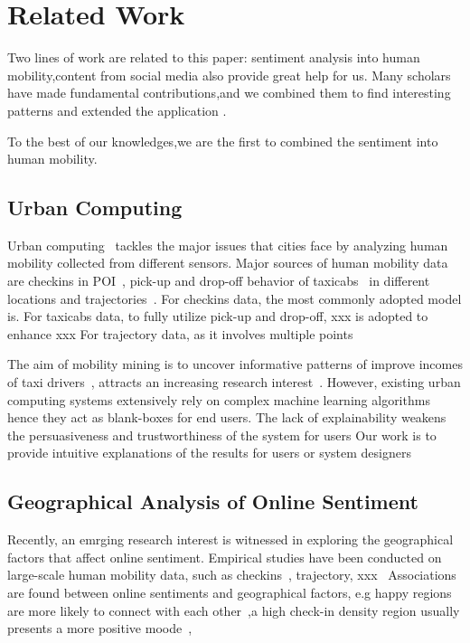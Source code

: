 \documentclass{llncs}
\begin{document}
\section{Related Work}

Two lines of work are related to this paper: sentiment analysis into human mobility,content from social media also provide great help for us. Many scholars have made fundamental contributions,and we combined them to find interesting patterns and extended the application .

To the best of our knowledges,we are the first to combined the sentiment into human mobility.

\subsection{Urban Computing}
%
Urban computing~\cite{1} tackles the major issues that cities face by analyzing human mobility collected from different sensors.  
Major sources of human mobility data are checkins in POI~\cite{}, pick-up and drop-off behavior of taxicabs~\cite{} in different locations and  trajectories~\cite{}.
For checkins data, the most commonly adopted model is.
For taxicabs data, to fully utilize pick-up and drop-off, xxx is adopted to enhance xxx
For trajectory data, as it involves multiple points 

The aim of mobility mining is to uncover informative patterns of improve incomes of taxi drivers~\cite{}, attracts an increasing research interest~\cite{}. 
However, existing urban computing systems extensively rely on complex machine learning algorithms hence they act as blank-boxes for end users. 
The lack of explainability weakens the persuasiveness and trustworthiness of the system for users
Our work is to provide intuitive explanations of the results for users or system designers



\subsection{Geographical Analysis of Online Sentiment}
Recently, an emrging research interest is witnessed in exploring the geographical factors that affect online sentiment.
Empirical studies have been conducted on large-scale human mobility data, such as checkins~\cite{}, trajectory, xxx~\cite{}
Associations are found between online sentiments and geographical factors, e.g happy regions are more likely to connect with each other~\cite{milan15},a high check-in density region usually presents a more positive moode~\cite{}, 
\end{document}
